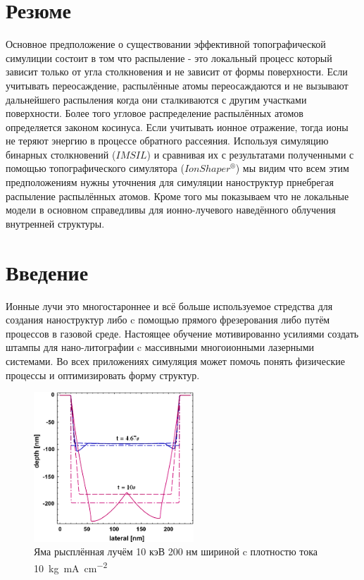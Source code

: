 \documentclass[a4paper,fontsize=12pt]{article}
\newcommand{\kev}{кэ\uppercase{В}}
\begin{document}
\section{Резюме}
Основное предположение о существовании эффективной топографической симулиции состоит в том что распыление - это локальный процесс который зависит только от угла столкновения и не зависит от формы поверхности. Если учитывать переосаждение, распылённые атомы переосаждаются и не вызывают дальнейшего распыления когда они сталкиваются с другим участками поверхности. Более того угловое распределение распылённых атомов определяется законом косинуса. Если учитывать ионное отражение, тогда ионы не теряют энергию в процессе обратного рассеяния. Используя симуляцию бинарных столкновений ($IMSIL$) и сравнивая их с результатами полученными с помощью топографического симулятора ($IonShaper^{®}$) мы видим что всем этим предположениям нужны уточнения для симуляции наноструктур прнебрегая распыление распылённых атомов. Кроме того мы показываем что не локальные модели в основном справедливы для ионно-лучевого наведённого облучения внутренней структуры.


\section{Введение}
Ионные лучи это многостароннее и всё больше используемое стредства для создания наноструктур либо c помощью прямого фрезерования либо путём процессов в газовой среде. Настоящее обучение мотивированно усилиями создать штампы для нано-литографии c массивными многоионными лазерными системами. Во всех приложениях симуляция может помочь понять физические процессы и оптимизировать форму структур.


\begin{figure}[h]
    \centering
    \includegraphics[width=6cm]{images/part1/1.eps}
    \caption{Яма рысплённая лучём 10 \kev{} 200 нм шириной c плотностю тока \SI[per-mode=fraction]{10}{\kilo\g\milli\ampere\per\square\centi\meter} }
    \label{fig:part1TrenchShape}
\end{figure}
\end{document}
